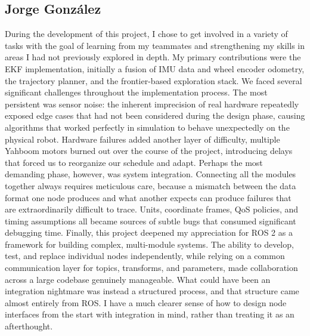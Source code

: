 \documentclass[11pt]{article}
\begin{document}
\subsection*{Jorge González}
During the development of this project, I chose to get involved in a variety of tasks with the goal of learning from my teammates and strengthening my skills in areas I had not previously explored in depth. My primary contributions were the EKF implementation, initially a fusion of IMU data and wheel encoder odometry, the trajectory planner, and the frontier-based exploration stack. We faced several significant challenges throughout the implementation process. The most persistent was sensor noise: the inherent imprecision of real hardware repeatedly exposed edge cases that had not been considered during the design phase, causing algorithms that worked perfectly in simulation to behave unexpectedly on the physical robot. Hardware failures added another layer of difficulty, multiple Yahboom motors burned out over the course of the project, introducing delays that forced us to reorganize our schedule and adapt. Perhaps the most demanding phase, however, was system integration. Connecting all the modules together always requires meticulous care, because a mismatch between the data format one node produces and what another expects can produce failures that are extraordinarily difficult to trace. Units, coordinate frames, QoS policies, and timing assumptions all became sources of subtle bugs that consumed significant debugging time.
Finally, this project deepened my appreciation for ROS 2 as a framework for building complex, multi-module systems. The ability to develop, test, and replace individual nodes independently, while relying on a common communication layer for topics, transforms, and parameters, made collaboration across a large codebase genuinely manageable. What could have been an integration nightmare was instead a structured process, and that structure came almost entirely from ROS. I have a much clearer sense of how to design node interfaces from the start with integration in mind, rather than treating it as an afterthought.
\vspace{4em}
\end{document}
